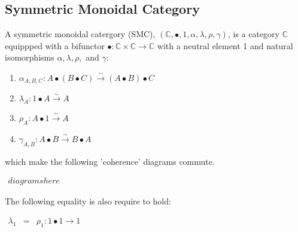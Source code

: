 \subsection{Symmetric Monoidal Category}
\label{subsec:symmetric_monoidal_category}
\begin{definition}
    A symmetric monoidal catergory (SMC), $(\mathbb{C},\bullet,1,\alpha,\lambda,\rho,\gamma)$, is a category $\mathbb{C}$ 
    equippped with a bifunctor $\bullet:\mathbb{C}\times\mathbb{C}\rightarrow\mathbb{C}$ with a neutral element 1 and natural isomorphisms 
    $\alpha, \lambda, \rho,$ and $\gamma$:
    \begin{enumerate}
        \item $\alpha_{A,B,C} : A \bullet (B \bullet C) \xrightarrow{\sim} (A \bullet B) \bullet C$
        \item $\lambda_A : 1 \bullet A \xrightarrow{\sim} A$
        \item $\rho_A : A \bullet 1 \xrightarrow{\sim} A$
        \item $\gamma_{A,B} : A \bullet B \xrightarrow{\sim} B \bullet A$
    \end{enumerate}
    which make the following 'coherence' diagrams commute.
    \begin{center}
        \begin{math}
            \begin{array}{c}
                diagrams here
            \end{array}
        \end{math}
    \end{center}
    The following equality is also require to hold:
    \begin{center}
        \begin{math}
            \begin{array}{lcl}
                \lambda_1 & = & \rho_1 : 1 \bullet 1 \rightarrow 1
            \end{array}
        \end{math}
    \end{center}
\end{definition}

